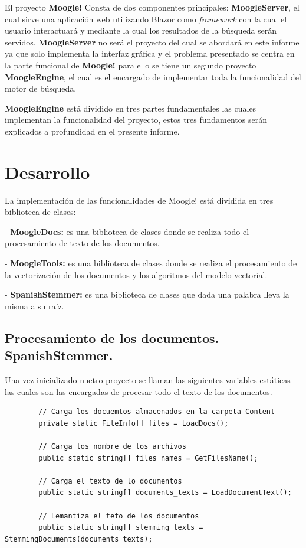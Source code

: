 \documentclass[a4paper,12pt]{article}
\begin{document}
	El proyecto \textbf{Moogle!} Consta de dos componentes principales: \textbf{MoogleServer}, el cual sirve una aplicación web utilizando Blazor como \emph{framework} con la cual el usuario interactuará y mediante la cual los resultados de la búsqueda serán servidos. \textbf{MoogleServer} no será el proyecto del cual se abordará en este informe ya que solo implementa la interfaz gráfica y el problema presentado se centra en la parte funcional de \textbf{Moogle!} para ello se tiene un segundo proyecto \textbf{MoogleEngine}, el cual es el encargado de implementar toda la funcionalidad del motor de búsqueda.
	
	\textbf{MoogleEngine} está dividido en tres partes fundamentales las cuales implementan la funcionalidad del proyecto, estos tres fundamentos serán explicados a profundidad en el presente informe.
	
	\newpage
	
	\section{Desarrollo}\label{sec:desarrollo}
	
	La implementación de las funcionalidades de Moogle!  está dividida en tres biblioteca de clases:
	
	- \textbf{MoogleDocs:} es una biblioteca de clases donde se realiza todo el procesamiento de texto de los documentos.
	
	- \textbf{MoogleTools:} es una biblioteca de clases donde se realiza el procesamiento de la vectorización de los documentos y los algoritmos del modelo vectorial.
	
	- \textbf{SpanishStemmer:}  es una biblioteca de clases que dada una palabra lleva la misma a su raíz.
	
	\subsection{Procesamiento de los documentos. SpanishStemmer.}\label{sub:procesamiento}
	
	Una vez inicializado nuetro proyecto se llaman las siguientes variables estáticas las cuales son las encargadas de procesar todo el texto de los documentos.
	
	\begin{verbatim}
		// Carga los docuemtos almacenados en la carpeta Content
		private static FileInfo[] files = LoadDocs();
		
		// Carga los nombre de los archivos
		public static string[] files_names = GetFilesName();
		
		// Carga el texto de lo documentos
		public static string[] documents_texts = LoadDocumentText();
		
		// Lemantiza el teto de los documentos
		public static string[] stemming_texts = StemmingDocuments(documents_texts);
	\end{verbatim}
	
\end{document}
